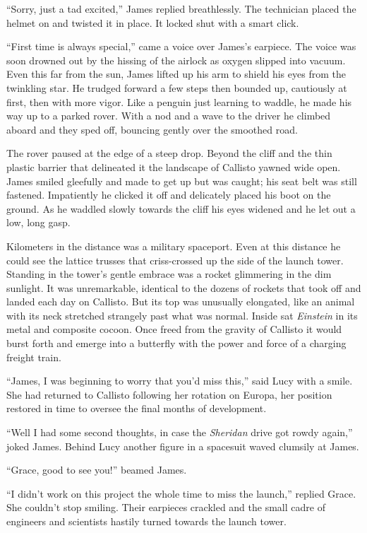 \documentclass[12pt]{article} %
\begin{document}
``Sorry, just a tad excited,'' James replied breathlessly. The technician placed the helmet on and twisted it in place. It locked shut with a smart click.

``First time is always special,'' came a voice over James's earpiece. The voice was soon drowned out by the hissing of the airlock as oxygen slipped into vacuum. Even this far from the sun, James lifted up his arm to shield his eyes from the twinkling star. He trudged forward a few steps then bounded up, cautiously at first, then with more vigor. Like a penguin just learning to waddle, he made his way up to a parked rover. With a nod and a wave to the driver he climbed aboard and they sped off, bouncing gently over the smoothed road.

The rover paused at the edge of a steep drop. Beyond the cliff and the thin plastic barrier that delineated it the landscape of Callisto yawned wide open. James smiled gleefully and made to get up but was caught; his seat belt was still fastened. Impatiently he clicked it off and delicately placed his boot on the ground. As he waddled slowly towards the cliff his eyes widened and he let out a low, long gasp.

Kilometers in the distance was a military spaceport. Even at this distance he could see the lattice trusses that criss-crossed up the side of the launch tower. Standing in the tower's gentle embrace was a rocket glimmering in the dim sunlight. It was unremarkable, identical to the dozens of rockets that took off and landed each day on Callisto. But its top was unusually elongated, like an animal with its neck stretched strangely past what was normal. Inside sat \textit{Einstein} in its metal and composite cocoon. Once freed from the gravity of Callisto it would burst forth and emerge into a butterfly with the power and force of a charging freight train.

``James, I was beginning to worry that you'd miss this,'' said Lucy with a smile. She had returned to Callisto following her rotation on Europa, her position restored in time to oversee the final months of development.

``Well I had some second thoughts, in case the \textit{Sheridan} drive got rowdy again,'' joked James. Behind Lucy another figure in a spacesuit waved clumsily at James.

``Grace, good to see you!'' beamed James.

``I didn't work on this project the whole time to miss the launch,'' replied Grace. She couldn't stop smiling. Their earpieces crackled and the small cadre of engineers and scientists hastily turned towards the launch tower.
\end{document}

